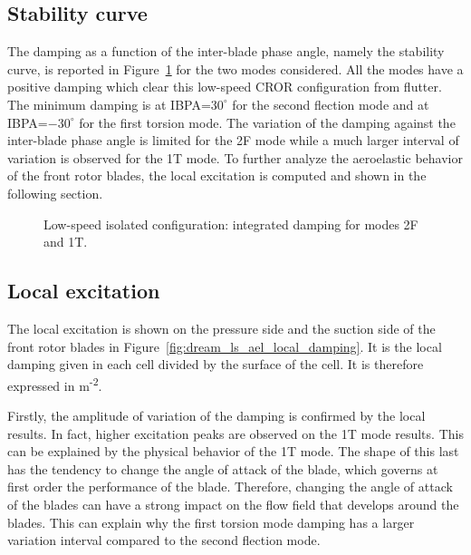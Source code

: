 
\subsection{Stability curve}
\label{sub:dream_ls_ael_curve}

The damping as a function of the inter-blade phase angle, namely the stability
curve, is reported  
in Figure~\ref{fig:dream_ls_ael_damping} for the two modes considered.
All the modes have a positive damping which clear this low-speed CROR configuration
from flutter. The minimum damping is at IBPA=$30^\circ$ for the second flection
mode and at IBPA=$-30^\circ$ for the first torsion mode.
The variation of the damping against the inter-blade phase angle is
limited for the 2F mode while a much larger interval of variation is
observed for the 1T mode. To further analyze the aeroelastic behavior
of the front rotor blades, the local excitation is computed and shown
in the following section.
\begin{figure}[htp]
  \centering
  \caption{Low-speed isolated configuration: integrated damping for modes 2F and 1T.}
  \label{fig:dream_ls_ael_damping}
\end{figure}

\subsection{Local excitation}
\label{sub:dream_ls_ael_local_damping}

The local excitation is shown on the pressure side and
the suction side of the front rotor blades in 
Figure~\ref{fig:dream_ls_ael_local_damping}. It is the
local damping given in each cell divided by the 
surface of the cell. It is therefore expressed in
m\textsuperscript{-2}.

Firstly, the amplitude of variation of the damping
is confirmed by the local results. In fact, higher excitation peaks
are observed on the 1T mode results. This can be explained
by the physical behavior of the 1T mode. The shape of this last
has the tendency to change the angle of attack of the blade,
which governs at first order the
performance of the blade. Therefore, changing the angle of attack
of the blades can have a strong impact on the flow field
that develops around the blades. This can explain why the
first torsion mode damping has a larger variation interval
compared to the second flection mode.


